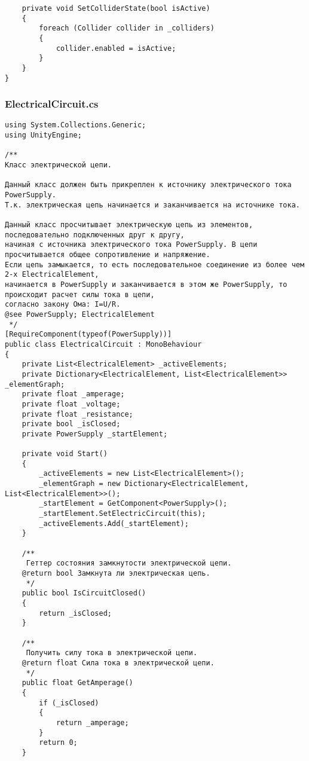 \begin{verbatim}
    private void SetColliderState(bool isActive)
    {
        foreach (Collider collider in _colliders)
        {
            collider.enabled = isActive;
        }
    }
}

\end{verbatim}
\subsubsection*{ElectricalCircuit.cs}
\begin{verbatim}
﻿using System.Collections.Generic;
using UnityEngine;

/**
Класс электрической цепи.

Данный класс должен быть прикреплен к источнику электрического тока PowerSupply.
Т.к. электрическая цепь начинается и заканчивается на источнике тока.

Данный класс просчитывает электрическую цепь из элементов, последовательно подключенных друг к другу, 
начиная с источника электрического тока PowerSupply. В цепи просчитывается общее сопротивление и напряжение.
Если цепь замыкается, то есть последовательное соединение из более чем 2-х ElectricalElement, 
начинается в PowerSupply и заканчивается в этом же PowerSupply, то происходит расчет силы тока в цепи, 
согласно закону Ома: I=U/R.
@see PowerSupply; ElectricalElement
 */
[RequireComponent(typeof(PowerSupply))]
public class ElectricalCircuit : MonoBehaviour
{
    private List<ElectricalElement> _activeElements;
    private Dictionary<ElectricalElement, List<ElectricalElement>> _elementGraph;
    private float _amperage;
    private float _voltage;
    private float _resistance;
    private bool _isClosed;
    private PowerSupply _startElement;

    private void Start()
    {
        _activeElements = new List<ElectricalElement>();
        _elementGraph = new Dictionary<ElectricalElement, List<ElectricalElement>>();
        _startElement = GetComponent<PowerSupply>();
        _startElement.SetElectricCircuit(this);
        _activeElements.Add(_startElement);
    }

    /**
     Геттер состояния замкнутости электрической цепи.
    @return bool Замкнута ли электрическая цепь.
     */
    public bool IsCircuitClosed()
    {
        return _isClosed;
    }

    /**
     Получить силу тока в электрической цепи.
    @return float Сила тока в электрической цепи.
     */
    public float GetAmperage()
    {
        if (_isClosed)
        {
            return _amperage;
        }
        return 0;
    }


\end{verbatim}
